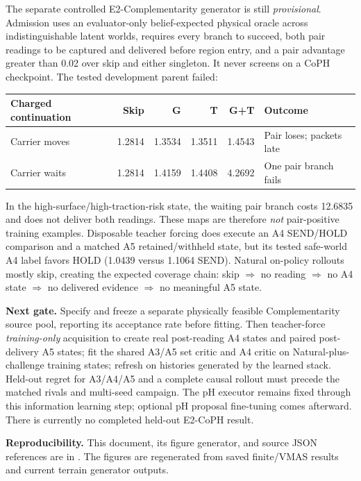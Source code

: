 \documentclass[10pt]{article}
\begin{document}
The separate controlled E2-Complementarity generator is still
\emph{provisional}. Admission uses an evaluator-only belief-expected physical
oracle across indistinguishable latent worlds, requires every branch to
succeed, both pair readings to be captured and delivered before region entry,
and a pair advantage greater than 0.02 over skip and either singleton.
It never screens on a CoPH checkpoint. The tested development parent failed:
\begin{center}\small
\begin{tabular}{lrrrrl}\toprule
Charged continuation & Skip & G & T & G+T & Outcome \\\midrule
Carrier moves & 1.2814 & 1.3534 & 1.3511 & 1.4543 & Pair loses; packets late \\
Carrier waits & 1.2814 & 1.4159 & 1.4408 & 4.2692 & One pair branch fails \\
\bottomrule
\end{tabular}
\end{center}
In the high-surface/high-traction-risk state, the waiting pair branch costs
12.6835 and does not deliver both readings. These maps are therefore
\emph{not} pair-positive training examples. Disposable teacher forcing does
execute an A4 SEND/HOLD comparison and a matched A5 retained/withheld state,
but its tested safe-world A4 label favors HOLD (1.0439 versus 1.1064 SEND).
Natural on-policy rollouts mostly skip, creating the expected coverage
chain: skip $\Rightarrow$ no reading $\Rightarrow$ no A4 state $\Rightarrow$
no delivered evidence $\Rightarrow$ no meaningful A5 state.

\textbf{Next gate.} Specify and freeze a separate physically feasible
Complementarity source pool, reporting its acceptance rate before fitting.
Then teacher-force \emph{training-only} acquisition to create real
post-reading A4 states and paired post-delivery A5 states; fit the shared
A3/A5 set critic and A4 critic on Natural-plus-challenge training states;
refresh on histories generated by the learned stack. Held-out regret for
A3/A4/A5 and a complete causal rollout must precede the matched rivals and
multi-seed campaign. The pH executor remains fixed through this information
learning step; optional pH proposal fine-tuning comes afterward. There is
currently no completed held-out E2-CoPH result.

\vspace{.3em}\noindent\textbf{Reproducibility.} This document, its figure
generator, and source JSON references are in
. The figures are regenerated
from saved finite/VMAS results and current terrain generator outputs.
\end{document}

